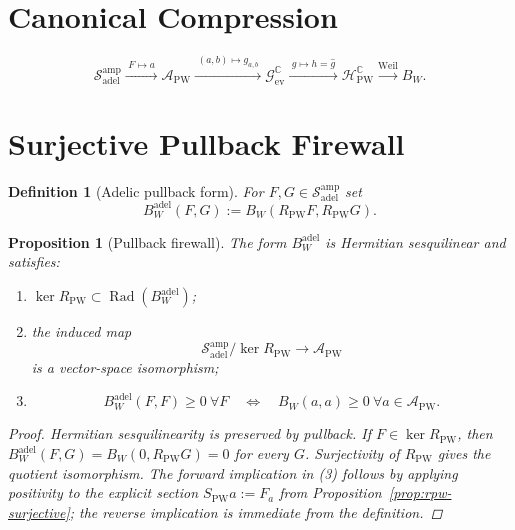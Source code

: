 \documentclass[11pt,a4paper]{amsart}
\newtheorem{proposition}[theorem]{Proposition}
\newtheorem{definition}[theorem]{Definition}
\begin{document}
\section{Canonical Compression}

\[
  \boxed{
  \mathcal{S}_{\mathrm{adel}}^{\mathrm{amp}}
  \xrightarrow{\;F\mapsto a\;} \mathcal{A}_{\mathrm{PW}}
  \xrightarrow{\;(a,b)\mapsto g_{a,b}\;} \mathcal{G}_{\mathrm{ev}}^{\mathbb{C}}
  \xrightarrow{\;g\mapsto h=\hat g\;} \mathcal{H}_{\mathrm{PW}}^{\mathbb{C}}
  \xrightarrow{\mathrm{Weil}} B_W.
  }
\]

\section{Surjective Pullback Firewall}

\begin{definition}[Adelic pullback form]\label{def:bwadel}
For $F,G\in\mathcal{S}_{\mathrm{adel}}^{\mathrm{amp}}$ set
\[
  B_W^{\mathrm{adel}}(F,G)
  := B_W(R_{\mathrm{PW}}F,R_{\mathrm{PW}}G).
\]
\end{definition}

\begin{proposition}[Pullback firewall]\label{prop:pullback-firewall}
The form $B_W^{\mathrm{adel}}$ is Hermitian sesquilinear and satisfies:
\begin{enumerate}
\item $\ker R_{\mathrm{PW}}\subset\operatorname{Rad}(B_W^{\mathrm{adel}})$;
\item the induced map
\[
  \mathcal{S}_{\mathrm{adel}}^{\mathrm{amp}}/\ker R_{\mathrm{PW}}
  \longrightarrow \mathcal{A}_{\mathrm{PW}}
\]
is a vector-space isomorphism;
\item
\[
  B_W^{\mathrm{adel}}(F,F)\ge0\ \forall F
  \quad\Longleftrightarrow\quad
  B_W(a,a)\ge0\ \forall a\in\mathcal{A}_{\mathrm{PW}}.
\]
\end{enumerate}
\begin{proof}
Hermitian sesquilinearity is preserved by pullback. If
$F\in\ker R_{\mathrm{PW}}$, then
$B_W^{\mathrm{adel}}(F,G)=B_W(0,R_{\mathrm{PW}}G)=0$ for every $G$.
Surjectivity of $R_{\mathrm{PW}}$ gives the quotient isomorphism.
The forward implication in (3) follows by applying positivity to the explicit
section $S_{\mathrm{PW}}a:=F_a$ from Proposition~\ref{prop:rpw-surjective};
the reverse implication is immediate from the definition.
\end{proof}
\end{proposition}
\end{document}
